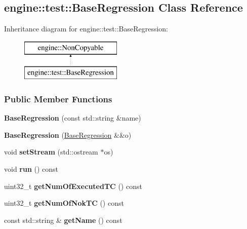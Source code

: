 \hypertarget{a00006}{}\subsection{engine\+:\+:test\+:\+:Base\+Regression Class Reference}
\label{a00006}
Inheritance diagram for engine\+:\+:test\+:\+:Base\+Regression\+:\begin{figure}[H]
\begin{center}
\leavevmode
\includegraphics[height=2.000000cm]{a00006}
\end{center}
\end{figure}
\subsubsection*{Public Member Functions}
\begin{DoxyCompactItemize}
\item 
{\bfseries Base\+Regression} (const std\+::string \&name)\hypertarget{a00006_a8fabc03796870f6fc5f7268ce178ce3b}{}\label{a00006_a8fabc03796870f6fc5f7268ce178ce3b}

\item 
{\bfseries Base\+Regression} (\hyperlink{a00006}{Base\+Regression} \&\&o)\hypertarget{a00006_a5649c6763dc88ff4073f27bdc2f718a0}{}\label{a00006_a5649c6763dc88ff4073f27bdc2f718a0}

\item 
void {\bfseries set\+Stream} (std\+::ostream $\ast$os)\hypertarget{a00006_a13f0523e2c149436b9df0ac387d832cf}{}\label{a00006_a13f0523e2c149436b9df0ac387d832cf}

\item 
void {\bfseries run} () const \hypertarget{a00006_a796b6b12ced0f2e5972b9cd249321f22}{}\label{a00006_a796b6b12ced0f2e5972b9cd249321f22}

\item 
uint32\+\_\+t {\bfseries get\+Num\+Of\+Executed\+TC} () const \hypertarget{a00006_afe9eac73f67f52b7c1fbbb137d4c9092}{}\label{a00006_afe9eac73f67f52b7c1fbbb137d4c9092}

\item 
uint32\+\_\+t {\bfseries get\+Num\+Of\+Nok\+TC} () const \hypertarget{a00006_a07c85b15a052a380ebdbcb934f6368a1}{}\label{a00006_a07c85b15a052a380ebdbcb934f6368a1}

\item 
const std\+::string \& {\bfseries get\+Name} () const \hypertarget{a00006_ad4cc8d1ae709af2acd37463f9d378a77}{}\label{a00006_ad4cc8d1ae709af2acd37463f9d378a77}

\end{DoxyCompactItemize}
